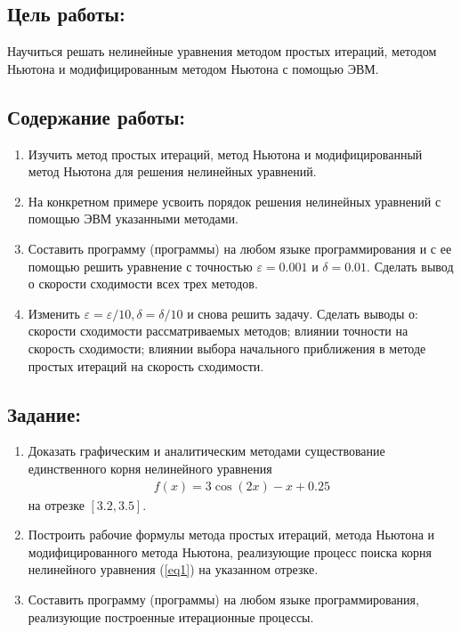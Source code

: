 \hypertarget{ux446ux435ux43bux44c-ux440ux430ux431ux43eux442ux44b}{%
\subsection{Цель
работы:}\label{ux446ux435ux43bux44c-ux440ux430ux431ux43eux442ux44b}}

Научиться решать нелинейные уравнения методом простых итераций, методом
Ньютона и модифицированным методом Ньютона с помощью ЭВМ.

\hypertarget{ux441ux43eux434ux435ux440ux436ux430ux43dux438ux435-ux440ux430ux431ux43eux442ux44b}{%
\subsection{Содержание
работы:}\label{ux441ux43eux434ux435ux440ux436ux430ux43dux438ux435-ux440ux430ux431ux43eux442ux44b}}

\begin{enumerate}
\def\labelenumi{\arabic{enumi}.}
\item
  Изучить метод простых итераций, метод Ньютона и модифицированный метод
  Ньютона для решения нелинейных уравнений.
\item
  На конкретном примере усвоить порядок решения нелинейных уравнений с
  помощью ЭВМ указанными методами.
\item
  Составить программу (программы) на любом языке программирования и с ее
  помощью решить уравнение с точностью \(\varepsilon = 0.001\) и
  \(\delta = 0.01\). Сделать вывод о скорости сходимости всех трех
  методов.
\item
  Изменить \(\varepsilon = \varepsilon / 10, \delta = \delta / 10\) и
  снова решить задачу. Сделать выводы о: скорости сходимости
  рассматриваемых методов; влиянии точности на скорость сходимости;
  влиянии выбора начального приближения в методе простых итераций на
  скорость сходимости.
\end{enumerate}

\hypertarget{ux437ux430ux434ux430ux43dux438ux435}{%
\subsection{Задание:}\label{ux437ux430ux434ux430ux43dux438ux435}}

\begin{enumerate}
\def\labelenumi{\arabic{enumi}.}
\item
  Доказать графическим и аналитическим методами существование
  единственного корня нелинейного уравнения \begin{align}\label{eq1}
  f(x) = 3 \cos(2x) - x + 0.25
  \end{align} на отрезке \([3.2, 3.5]\).
\item
  Построить рабочие формулы метода простых итераций, метода Ньютона и
  модифицированного метода Ньютона, реализующие процесс поиска корня
  нелинейного уравнения (\ref{eq1}) на указанном отрезке.
\item
  Составить программу (программы) на любом языке программирования,
  реализующие построенные итерационные процессы.
\end{enumerate}

